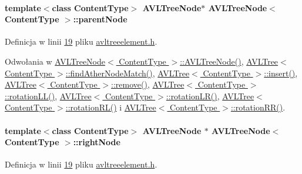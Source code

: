 \hypertarget{class_a_v_l_tree_node_ae64d1261fea217d3e85928e7cf2a9151}{
\paragraph[{parent\-Node}]{\setlength{\rightskip}{0pt plus 5cm}template$<$class Content\-Type$>$ {\bf A\-V\-L\-Tree\-Node}$\ast$ {\bf A\-V\-L\-Tree\-Node}$<$ Content\-Type $>$\-::parent\-Node}}\label{class_a_v_l_tree_node_ae64d1261fea217d3e85928e7cf2a9151}


Definicja w linii \hyperlink{avltreeelement_8h_source_l00019}{19} pliku \hyperlink{avltreeelement_8h_source}{avltreeelement.\-h}.



Odwołania w \hyperlink{avltreeelement_8h_source_l00027}{A\-V\-L\-Tree\-Node$<$ Content\-Type $>$\-::\-A\-V\-L\-Tree\-Node()}, \hyperlink{avltree_8h_source_l00271}{A\-V\-L\-Tree$<$ Content\-Type $>$\-::find\-Ather\-Node\-Match()}, \hyperlink{avltree_8h_source_l00049}{A\-V\-L\-Tree$<$ Content\-Type $>$\-::insert()}, \hyperlink{avltree_8h_source_l00289}{A\-V\-L\-Tree$<$ Content\-Type $>$\-::remove()}, \hyperlink{avltree_8h_source_l00166}{A\-V\-L\-Tree$<$ Content\-Type $>$\-::rotation\-L\-L()}, \hyperlink{avltree_8h_source_l00222}{A\-V\-L\-Tree$<$ Content\-Type $>$\-::rotation\-L\-R()}, \hyperlink{avltree_8h_source_l00195}{A\-V\-L\-Tree$<$ Content\-Type $>$\-::rotation\-R\-L()} i \hyperlink{avltree_8h_source_l00137}{A\-V\-L\-Tree$<$ Content\-Type $>$\-::rotation\-R\-R()}.

\hypertarget{class_a_v_l_tree_node_a51dfb148f27625c89a3a153760517c38}{
\paragraph[{right\-Node}]{\setlength{\rightskip}{0pt plus 5cm}template$<$class Content\-Type$>$ {\bf A\-V\-L\-Tree\-Node} $\ast$ {\bf A\-V\-L\-Tree\-Node}$<$ Content\-Type $>$\-::right\-Node}}\label{class_a_v_l_tree_node_a51dfb148f27625c89a3a153760517c38}


Definicja w linii \hyperlink{avltreeelement_8h_source_l00019}{19} pliku \hyperlink{avltreeelement_8h_source}{avltreeelement.\-h}.




